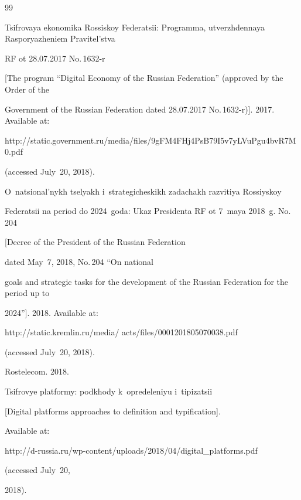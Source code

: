 {\small\frenchspacing


{%




\begin{thebibliography}{99}







Tsifrovaya ekonomika Rossiskoy Federatsii: Programma, utverzhdennaya Rasporyazheniem Pravitel'stva


RF ot 28.07.2017 No.\,1632-r


[The program ``Digital Economy of the Russian Federation'' (approved by the Order of the 


Government of the Russian Federation dated 28.07.2017 No.\,1632-r)]. 2017. Available at: {\sf 


http://\linebreak static.government.ru/media/files/9gFM4FHj4PsB79I5v7yLVuPgu4bvR7M0.pdf} 


(accessed July~20, 2018).




O~natsional'nykh tselyakh i~strategicheskikh zadachakh razvitiya Rossiyskoy


Federatsii na period do 2024~goda: Ukaz Presidenta RF ot 7~maya 2018~g. No.\,204


[Decree of the President of the Russian Federation


dated May~7, 2018, No.\,204 ``On national 


goals and strategic tasks for the development of the Russian Federation for the period up to 


2024'']. 2018. Available at: {\sf 


http://static.kremlin.ru/media/ acts/files/0001201805070038.pdf} (accessed July~20, 2018).




Rostelecom. 2018. 


Tsifrovye platformy: podkhody k~opredeleniyu i~ti\-pi\-za\-tsii


[Digital platforms approaches to definition and typification].


Available at: {\sf  


http://\linebreak d-russia.ru/wp-content/uploads/2018/04/digital\_platforms.pdf} (accessed July~20, 


2018).



\end{thebibliography}}}
